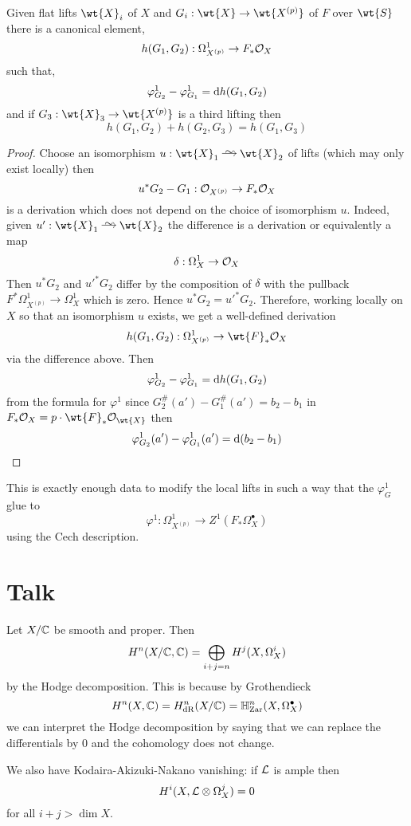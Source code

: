 \documentclass[12pt]{article}
\newcommand{\HH}{\mathbb{H}}
\begin{document}
\begin{lemma}
Given flat lifts $\wt{X}_i$ of $X$ and $G_i : \wt{X} \to \wt{X^{(p)}}$ of $F$ over $\wt{S}$ there is a canonical element,
\[ h(G_1, G_2) : \Omega^1_{X^{(p)}} \to F_* \mathcal{O}_{X} \]
such that,
\[ \varphi^1_{G_2} - \varphi^1_{G_1} = \mathrm{d}{h(G_1, G_2)} \] 
and if $G_3 : \wt{X}_3 \to \wt{X^{(p)}}$ is a third lifting then
\[ h(G_1, G_2) + h(G_2, G_3) = h(G_1, G_3) \]
\end{lemma}

\begin{proof}
Choose an isomorphism $u : \wt{X}_1 \iso \wt{X}_2$ of lifts (which may only exist locally) then 
\[ u^* G_2 - G_1 : \mathcal{O}_{X^{(p)}} \to F_* \mathcal{O}_{X} \]
is a derivation which does not depend on the choice of isomorphism $u$. Indeed, given $u' : \wt{X}_1 \iso \wt{X}_2$ the difference is a derivation or equivalently a map
\[ \delta : \Omega_{X}^1 \to \mathcal{O}_{X} \]
Then $u^* G_2$ and $u'^* G_2$ differ by the composition of $\delta$ with the pullback $F^* \Omega^1_{X^{(p)}} \to \Omega^1_{X}$ which is zero. Hence $u^* G_2 = u'^* G_2$. Therefore, working locally on $X$ so that an isomorphism $u$ exists, we get a well-defined derivation 
\[ h(G_1, G_2) : \Omega^1_{X^{(p)}} \to \wt{F}_* \struct{X} \]
via the difference above. Then 
\[ \varphi_{G_2}^1 - \varphi_{G_1}^1 = \mathrm{d}{h(G_1, G_2)} \]
from the formula for $\varphi^1$ since $G_2^{\#}(a') - G_1^{\#}(a') = b_2 - b_1$ in $F_* \struct{X} = p \cdot \wt{F}_* \struct{\wt{X}}$ then
\[ \varphi^1_{G_2}(a') - \varphi^1_{G_1}(a') = \mathrm{d}{(b_2 - b_1)} \]
\end{proof}

This is exactly enough data to modify the local lifts in such a way that the $\varphi_{G}^1$ glue to
\[ \varphi^1 : \Omega^1_{X^{(p)}} \to Z^1(F_* \Omega_X^\bullet) \]
using the Cech description.


\section{Talk}

\newcommand{\Zar}{\mathrm{Zar}}

Let $X / \mathbb{C}$ be smooth and proper. Then 
\[ H^n(X/\mathbb{C}, \mathbb{C}) = \bigoplus_{i + j = n} H^j(X, \Omega_X^i) \]
by the Hodge decomposition. This is because by Grothendieck
\[ H^n(X, \CC) = H^n_{\dR}(X/\CC) = \HH^n_{\Zar}(X, \Omega_X^\bullet) \]
we can interpret the Hodge decomposition by saying that we can replace the differentials by $0$ and the cohomology does not change. 
\par 
We also have Kodaira-Akizuki-Nakano vanishing: if $\mathcal{L}$ is ample then
\[ H^i(X, \mathcal{L} \otimes \Omega_X^j) = 0 \]
for all $i + j > \dim{X}$. 
\end{document}

